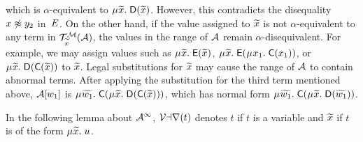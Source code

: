 \begin{examplex}
which is $\alpha$-equivalent to $\MU {\Varec{x}}.\; \const{D}( {\Varec{x}} )$.
However, this contradicts the disequality $x \not\approx y_2$ in~$E$.
On the other hand, if the value assigned to ${\widetilde{x}}$ is not $\alpha$-equivalent to any term in $\mathcal{T}^{\mathcal{M}}_{{\widetilde{x}}}( \mathcal{A} )$,
the values in the range of $\mathcal{A}$ remain $\alpha$-disequivalent.
For example, we may assign values such as 
$\MU {\Varec{x}}.\; \const{E}( {\Varec{x}} )$,
$\MU {\Varec{x}}.\; \const{E}( \MU x_1.\; \const{C}( x_1) )$, or
$\MU {\Varec{x}}.\; \const{D}( \const{C}( {\Varec{x}} ) )$
to ${\widetilde{x}}$.
Legal substitutions for ${\widetilde{x}}$ may cause the range of $\mathcal{A}$ to contain abnormal terms.
After applying the substitution for the third term mentioned above,
$\mathcal{A} [w_1]$ is $\MU {\Varec{w_1}}.\; \const{C}( \MU {\Varec{x}}.\; \const{D}( \const{C}( {\Varec{x}} ) ) )$,
which has normal form
$\MU {\Varec{w_1}}.\; \const{C}( \MU {\Varec{x}}.\; \const{D}( {\Varec{w_1}} ) )$.
\xend
\end{examplex}

In the following lemma about $\mathcal{A}^\infty$,
$\mathcal{Var}( t )$ denotes $t$ if $t$ is a variable and ${\widetilde{x}}$ if $t$ is of the form $\MU {\Varec{x}}.\; u$.

%

